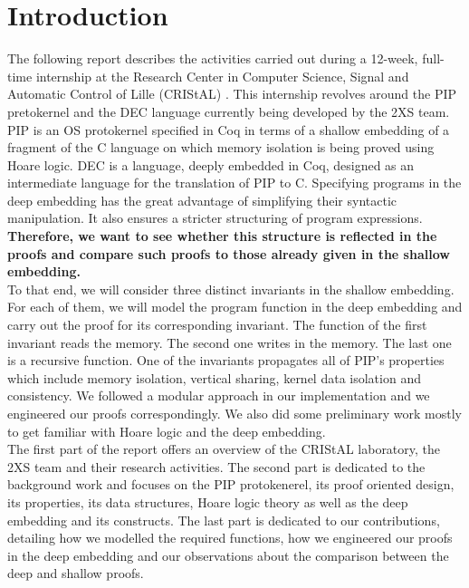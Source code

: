 \chapter{Introduction}
The following report describes the activities carried out during a 12-week, full-time internship at the Research Center in Computer Science, Signal and Automatic Control of Lille (CRIStAL) \cite{cristal}. This internship revolves around the PIP pretokernel and the DEC language currently being developed by the 2XS team. PIP \cite{PIP} is an OS protokernel specified in Coq in terms of a shallow embedding of a fragment of the C language on which memory isolation is being proved using Hoare logic. DEC \cite{DEC} is a language, deeply embedded in Coq, designed as an intermediate language for the translation of PIP to C. Specifying programs in the deep embedding has the great advantage of simplifying their syntactic manipulation. It also ensures a stricter structuring of program expressions. \textbf{Therefore, we want to see whether this structure is reflected in the proofs and compare such proofs to those already given in the shallow embedding.}\\ 

To that end, we will consider three distinct invariants in the shallow embedding. For each of them, we will model the program function in the deep embedding and carry out the proof for its corresponding invariant. The function of the first invariant reads the memory. The second one writes in the memory. The last one is a recursive function. One of the invariants propagates all of PIP's properties which include memory isolation, vertical sharing, kernel data isolation and consistency. We followed a modular approach in our implementation and we engineered our proofs correspondingly. We also did some preliminary work mostly to get familiar with Hoare logic and the deep embedding. \\

The first part of the report offers an overview of the CRIStAL laboratory, the 2XS team and their research activities. The second part is dedicated to the background work and focuses on the PIP protokenerel, its proof oriented design, its properties, its data structures, Hoare logic theory as well as the deep embedding and its constructs. The last part is dedicated to our contributions, detailing how we modelled the required functions, how we engineered our proofs in the deep embedding and our observations about the comparison between the deep and shallow proofs.
  



